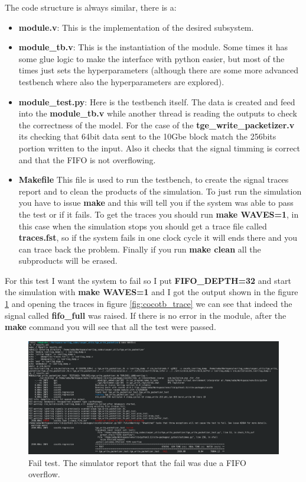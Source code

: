 The code structure is always similar, there is a:
\begin{itemize}
    \item \textbf{module.v}: This is the implementation of the desired subsystem.
    \item \textbf{module\_tb.v}: This is the instantiation of the module. Some times it has some glue logic to make the interface with python easier, but most of the times just sets the hyperparameters (although there are some more advanced testbench where also the hyperparameters are explored).
    \item \textbf{module\_test.py}: Here is the testbench itself. The data is created and feed into the \textbf{module\_tb.v} while another thread is reading the outputs to check the correctness of the model. For the case of the \textbf{tge\_write\_packetizer.v} its checking that 64bit data sent to the 10Gbe block match the 256bits portion written to the input. Also it checks that the signal timming is correct and that the FIFO is not overflowing.
    \item \textbf{Makefile} This file is used to run the testbench, to create the signal traces report and to clean the products of the simulation. To just run the simulation you have to issue \textbf{make} and this will tell you if the system was able to pass the test or if it fails. To get the traces you should run \textbf{make WAVES=1}, in this case when the simulation stops you should get a trace file called \textbf{traces.fst}, so if the system fails in one clock cycle it will ends there and you can trace back the problem. Finally if you run \textbf{make clean} all the subproducts will be erased.

\end{itemize}

For this test I want the system to fail so I put \textbf{FIFO\_DEPTH=32} and start the simulation with \textbf{make WAVES=1} and I got the output shown in the figure \ref{fig:cocotb_fail} and opening the traces in figure \ref{fig:cocotb_trace} we can see that indeed the signal called \textbf{fifo\_full} was raised. If there is no error in the module, after the \textbf{make} command you will see that all the test were passed.

\begin{figure}
    \centering
    \includegraphics[width=1\textwidth]{images/cocotb_out.png}
    \caption{Fail test. The simulator report that the fail was due a FIFO overflow.}
    \label{fig:cocotb_fail}
\end{figure}


